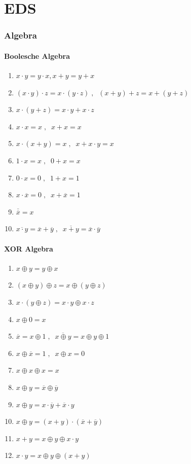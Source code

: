 \documentclass[a4paper,twocolumn,10pt]{article}
\begin{document}
\part*{EDS}

\section*{Algebra}
\subsection*{Boolesche Algebra}
\begin{enumerate}
	\item $x\cdot y=y\cdot x, x+y=y+x$
	\item $(x\cdot y)\cdot z=x\cdot (y\cdot z)\;,\;\;(x+y)+z=x+(y+z)$
	\item $x\cdot (y+z)=x\cdot y+x\cdot z$
	\item $x\cdot x=x\;,\;\; x+x=x$
	\item $x\cdot (x+y)=x\;,\;\; x+x\cdot y=x$
	\item $1\cdot x=x\;,\;\; 0+x=x$
	\item $0\cdot x=0\;,\;\; 1+x=1$
	\item $x\cdot \overline{x}=0\;,\;\; x+\overline{x}=1$
	\item $\overline{\overline{x}}=x$
	\item $\overline{x\cdot y}=\overline{x}+\overline{y}\;,\;\; \overline{x+y}=\overline{x}\cdot \overline{y}$
\end{enumerate}

\subsection*{XOR Algebra}
\begin{enumerate}
	\item $x\oplus y=y\oplus x$
	\item $(x\oplus y)\oplus z=x\oplus (y\oplus z)$
	\item $x\cdot (y\oplus z)=x\cdot y\oplus x\cdot z$
	\item $x\oplus 0=x$
	\item $\overline{x}=x\oplus 1\;,\;\; \overline{x\oplus y}=x\oplus y\oplus 1$
	\item $x\oplus\overline{x}=1\;,\;\; x\oplus x=0$
	\item $x\oplus x\oplus x=x$
	\item $x\oplus y=\overline{x}\oplus\overline{y}$
	\item $x\oplus y=x\cdot\overline{y}+\overline{x}\cdot y$
	\item $x\oplus y=(x+y)\cdot(\overline{x}+\overline{y})$
	\item $x+y=x\oplus y\oplus x\cdot y$
	\item $x\cdot y=x\oplus y\oplus (x+y)$
\end{enumerate}
\end{document}
